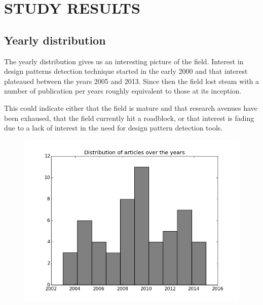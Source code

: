 \documentclass[letterpaper, 10 pt, conference]{ieeeconf}  %
\begin{document}
\section{STUDY RESULTS}

\subsection{Yearly distribution}

The yearly distribution gives us an interesting picture of the field.
Interest in design patterns detection technique started in the early
2000 and that interest plateaued between the years 2005 and 2013.
Since then the field lost steam with a number of publication per years
roughly equivalent to those at its inception.

This could indicate either that the field is mature and that research avenues
have been exhaused, that the field currently hit a roadblock, or that interest
is fading due to a lack of interest in the need for design pattern detection
tools.

\begin{figure}
  \centering
  \includegraphics[scale=0.450]{year_distribution.png}
  \caption{}
\end{figure}
\end{document}
